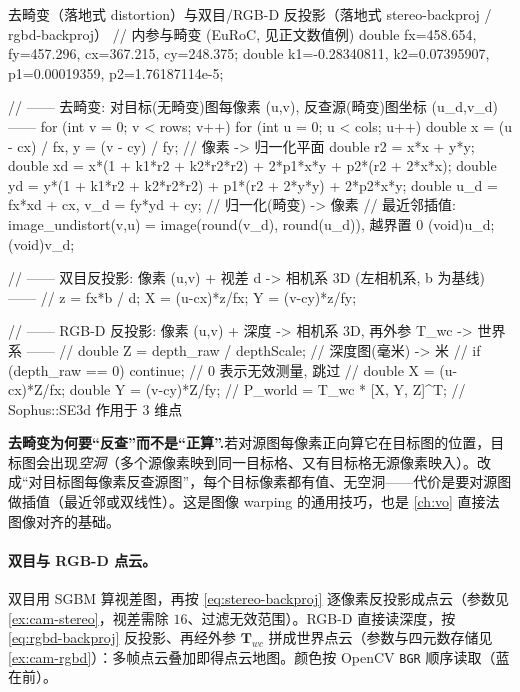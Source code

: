 \begin{codebox}[C++]{去畸变（落地式 distortion）与双目/RGB-D 反投影（落地式 stereo-backproj / rgbd-backproj）}
// 内参与畸变 (EuRoC, 见正文数值例)
double fx=458.654, fy=457.296, cx=367.215, cy=248.375;
double k1=-0.28340811, k2=0.07395907, p1=0.00019359, p2=1.76187114e-5;

// —— 去畸变: 对目标(无畸变)图每像素 (u,v), 反查源(畸变)图坐标 (u_d,v_d) ——
for (int v = 0; v < rows; v++)
  for (int u = 0; u < cols; u++) {
    double x = (u - cx) / fx, y = (v - cy) / fy;   // 像素 -> 归一化平面
    double r2 = x*x + y*y;
    double xd = x*(1 + k1*r2 + k2*r2*r2) + 2*p1*x*y + p2*(r2 + 2*x*x);
    double yd = y*(1 + k1*r2 + k2*r2*r2) + p1*(r2 + 2*y*y) + 2*p2*x*y;
    double u_d = fx*xd + cx, v_d = fy*yd + cy;      // 归一化(畸变) -> 像素
    // 最近邻插值: image_undistort(v,u) = image(round(v_d), round(u_d)), 越界置 0
    (void)u_d; (void)v_d;
  }

// —— 双目反投影: 像素 (u,v) + 视差 d -> 相机系 3D (左相机系, b 为基线) ——
//   z = fx*b / d;  X = (u-cx)*z/fx;  Y = (v-cy)*z/fy;

// —— RGB-D 反投影: 像素 (u,v) + 深度 -> 相机系 3D, 再外参 T_wc -> 世界系 ——
//   double Z = depth_raw / depthScale;     // 深度图(毫米) -> 米
//   if (depth_raw == 0) continue;          // 0 表示无效测量, 跳过
//   double X = (u-cx)*Z/fx;  double Y = (v-cy)*Z/fy;
//   P_world = T_wc * [X, Y, Z]^T;          // Sophus::SE3d 作用于 3 维点
\end{codebox}

\begin{note}
\textbf{去畸变为何要“反查”而不是“正算”.}\;若对源图每像素正向算它在目标图的位置，目标图会出现\emph{空洞}（多个源像素映到同一目标格、又有目标格无源像素映入）。改成“对目标图每像素反查源图”，每个目标像素都有值、无空洞——代价是要对源图做插值（最近邻或双线性）。这是图像 warping 的通用技巧，也是 \cref{ch:vo} 直接法图像对齐的基础。
\end{note}

\paragraph{双目与 RGB-D 点云。}
双目用 SGBM 算视差图，再按 \cref{eq:stereo-backproj} 逐像素反投影成点云（参数见 \cref{ex:cam-stereo}，视差需除 $16$、过滤无效范围）。RGB-D 直接读深度，按 \cref{eq:rgbd-backproj} 反投影、再经外参 $\mathbf{T}_{wc}$ 拼成世界点云（参数与四元数存储见 \cref{ex:cam-rgbd}）：多帧点云叠加即得点云地图。颜色按 OpenCV \texttt{BGR} 顺序读取（蓝在前）。


